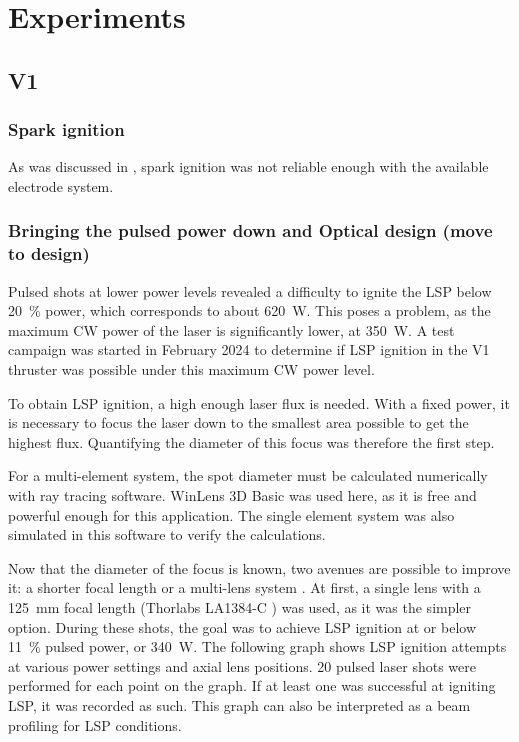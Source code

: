 \chapter{Experiments}

    \section{V1}

        \subsection{Spark ignition}
            
            As was discussed in \textcite{duplayArgonLaserPlasmaThruster2024a}, spark ignition was not reliable enough with the available electrode system. 

        \subsection{Bringing the pulsed power down and Optical design (move to design)} \label{sec:pulse_power_down_V1}
            
            Pulsed shots at lower power levels revealed a difficulty to ignite the LSP below \qty{20}{\%} power, which corresponds to about \qty{620}{W}. This poses a problem, as the maximum CW power of the laser is significantly lower, at \qty{350}{W}. A test campaign was started in February 2024 to determine if LSP ignition in the V1 thruster was possible under this maximum CW power level.
            
            To obtain LSP ignition, a high enough laser flux is needed. With a fixed power, it is necessary to focus the laser down to the smallest area possible to get the highest flux. Quantifying the diameter of this focus was therefore the first step. 


            For a multi-element system, the spot diameter must be calculated numerically with ray tracing software. WinLens 3D Basic \cite{winlens} was used here, as it is free and powerful enough for this application. The single element system was also simulated in this software to verify the calculations.

            Now that the diameter of the focus is known, two avenues are possible to improve it: a shorter focal length or a multi-lens system \cite{thorlabs}. At first, a single lens with a \qty{125}{mm} focal length (Thorlabs LA1384-C \cite{125mm lens}) was used, as it was the simpler option. During these shots, the goal was to achieve LSP ignition at or below \qty{11}{\%} pulsed power, or \qty{340}{W}. The following graph shows LSP ignition attempts at various power settings and axial lens positions. 20 pulsed laser shots were performed for each point on the graph. If at least one was successful at igniting LSP, it was recorded as such. This graph can also be interpreted as a beam profiling for LSP conditions.
            
